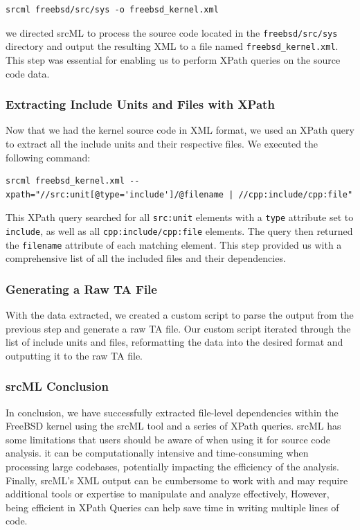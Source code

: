 \documentclass[12pt, dvipsnames, a4paper]{article}
\begin{document}
\begin{verbatim}
srcml freebsd/src/sys -o freebsd_kernel.xml
\end{verbatim}

we directed srcML to process the source code located in the \texttt{freebsd/src/sys} directory and output the resulting XML to a file named \texttt{freebsd\_kernel.xml}. This step was essential for enabling us to perform XPath queries on the source code data.

\subsubsection{Extracting Include Units and Files with XPath}

Now that we had the kernel source code in XML format, we used an XPath query to extract all the include units and their respective files. We executed the following command:

\begin{verbatim}
srcml freebsd_kernel.xml --xpath="//src:unit[@type='include']/@filename | //cpp:include/cpp:file"
\end{verbatim}

This XPath query searched for all \texttt{src:unit} elements with a \texttt{type} attribute set to \texttt{include}, as well as all \texttt{cpp:include/cpp:file} elements. The query then returned the \texttt{filename} attribute of each matching element. This step provided us with a comprehensive list of all the included files and their dependencies.

\subsubsection{Generating a Raw TA File}

With the data extracted, we created a custom script to parse the output from the previous step and generate a raw TA file.  Our custom script iterated through the list of include units and files, reformatting the data into the desired format and outputting it to the raw TA file.

\subsubsection{srcML Conclusion}

In conclusion, we have successfully extracted file-level dependencies within the FreeBSD kernel using the srcML tool and a series of XPath queries. srcML has some limitations that users should be aware of when using it for source code analysis. it can be computationally intensive and time-consuming when processing large codebases, potentially impacting the efficiency of the analysis. Finally, srcML's XML output can be cumbersome to work with and may require additional tools or expertise to manipulate and analyze effectively, However, being efficient in XPath Queries can help save time in writing multiple lines of code.
\end{document}

